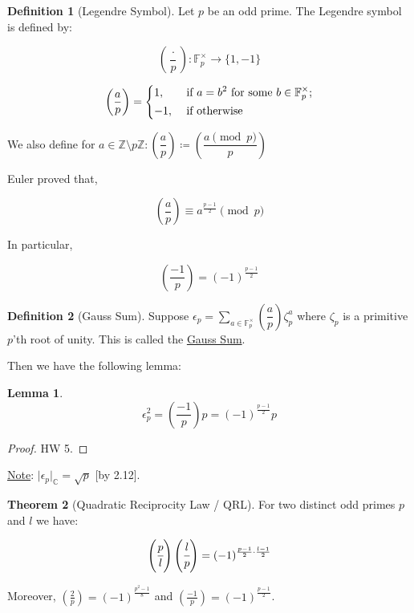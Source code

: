 \documentclass[openany]{amsbook}
\numberwithin{section}{chapter}
\theoremstyle{definition}
\newtheorem*{definition}{Definition}
\newtheorem{theorem}{Theorem}[chapter]
\newtheorem{lemma}[theorem]{Lemma}
\begin{document}
\begin{definition}
    [Legendre Symbol] Let \(p\) be an odd prime. The Legendre symbol is defined by:

    \[
        \left( \frac{\cdot}{p} \right) : \mathbb{F}_p^\times \to \{ 1, -1 \}
    \]

    \[
        \left( \frac{a}{p} \right) = \begin{dcases}
            1, &\text{ if } a = b^2 \text{ for some } b \in \mathbb{F}_p^\times ;\\
            -1, &\text{ if } \text{otherwise}
        \end{dcases}
    \]

    We also define for \(a\in \mathbb{Z} \setminus p\mathbb{Z} : \left( \dfrac{a}{p} \right) \coloneqq \left( \dfrac{a\pmod p}{p} \right) \) 
\end{definition}

Euler proved that,

\[
    \left( \frac{a}{p} \right) \equiv a^{\frac{p-1}{2}} \pmod p
\]

In particular,

\[
    \left( \frac{-1}{p} \right) = (-1)^{\frac{p-1}{2}}
\]

\begin{definition}
    [Gauss Sum] Suppose \(\epsilon_p = \displaystyle\sum_{a\in \mathbb{F} _p ^\times }^{} \left( \dfrac{a}{p} \right) \zeta_p ^ a\) where \(\zeta_p\) is a primitive \(p\)'th root of unity. This is called the \underline{Gauss Sum}.
\end{definition}

Then we have the following lemma:

\begin{lemma}
    \[
        \epsilon_p ^ 2 = \left( \dfrac{-1}{p} \right) p = (-1)^{\frac{p-1}{2}} p
    \]
\end{lemma}

\begin{proof}
    HW 5.
\end{proof}

\underline{Note}: \(\vert \epsilon_p \vert _{\mathbb{C}} = \sqrt{p}\) [by 2.12].

\begin{theorem}
    [Quadratic Reciprocity Law / QRL]

    For two distinct odd primes \(p\) and \(l\) we have:

    \[
        \left( \cfrac{p}{l} \right) \left( \cfrac{l}{p} \right) = (-1)^{\frac{p-1}{2}\cdot \frac{l-1}{2}}
    \]

    Moreover, \(\left( \frac{2}{p} \right) = (-1)^{\frac{p^2 - 1}{8}}\) and \(\left( \frac{-1}{p} \right) = (-1)^{\frac{p-1}{2}}\). 
\end{theorem}
\end{document}
